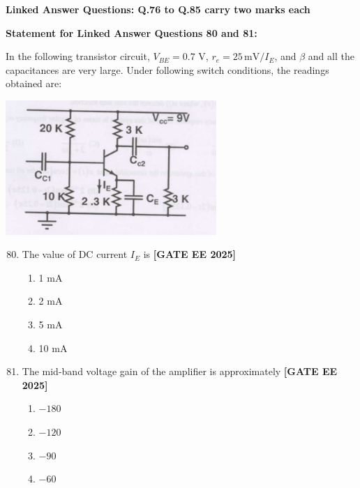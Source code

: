 \documentclass[12pt,a4paper]{article}
\begin{document}
\vspace{1em}
\item \textbf{Linked Answer Questions: Q.76 to Q.85 carry two marks each}
\item \textbf{Statement for Linked Answer Questions 80 and 81: }
\vspace{1em}
\newline
\item In the following transistor circuit, $V_{BE}=0.7$ V, $r_e = 25\,\text{mV}/I_E$, and $\beta$ and all the capacitances are very large. Under following switch conditions, the readings obtained are:
\begin{center}
\includegraphics[width=0.6\textwidth]{figs/q8081.png}
\end{center}

\begin{enumerate}[leftmargin=*, label=\textbf{Q.\arabic*:}]
\setcounter{enumi}{79}

\item The value of DC current $I_E$ is
\newline
\noindent \textbf{[GATE EE 2025]}
\begin{enumerate}[label=(\Alph*)]
  \item 1 mA
  \item 2 mA
  \item 5 mA
  \item 10 mA
\end{enumerate}

\item The mid-band voltage gain of the amplifier is approximately
\newline
\noindent \textbf{[GATE EE 2025]}
\begin{enumerate}[label=(\Alph*)]
  \item $-180$
  \item $-120$
  \item $-90$
  \item $-60$
\end{enumerate}

\end{enumerate}
\end{document}
